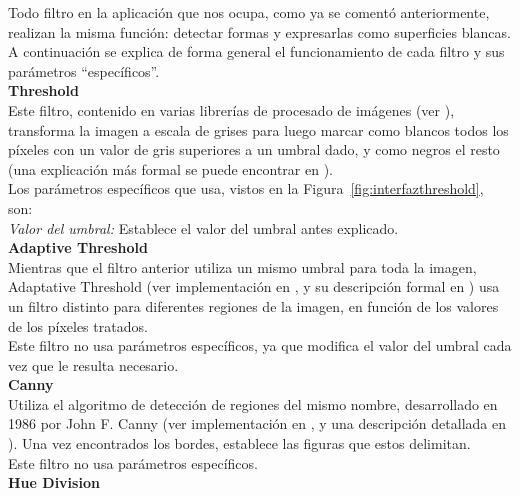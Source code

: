 		Todo filtro en la aplicación que nos ocupa, como ya se comentó anteriormente, realizan la misma función: detectar formas y expresarlas como superficies blancas. A continuación se explica de forma general el funcionamiento de cada filtro y sus parámetros ``específicos''.\\
		
	\noindent\textbf{Threshold}\\
		
		Este filtro, contenido en varias librerías de procesado de imágenes (ver \cite{opencvDoc}), transforma la imagen a escala de grises para luego marcar como blancos todos los píxeles con un valor de gris superiores a un umbral dado, y como negros el resto (una explicación más formal se puede encontrar en \cite{pajares}).\\
		
		Los parámetros específicos que usa, vistos en la Figura~\ref{fig:interfazthreshold}, son:\\		
		
		\noindent\textit{Valor del umbral:} Establece el valor del umbral antes explicado.\\
		
	\noindent\textbf{Adaptive Threshold}\\

		Mientras que el filtro anterior utiliza un mismo umbral para toda la imagen, Adaptative Threshold (ver implementación en \cite{opencvDoc},\color{blue} y su descripción formal en \cite{pajares}) usa un filtro distinto para diferentes regiones de la imagen, en función de los valores de los píxeles tratados.\color{black}\\ 
		
		Este filtro no usa parámetros específicos, ya que modifica el valor del umbral cada vez que le resulta necesario.\\
		
	\noindent\textbf{Canny}\\

		Utiliza el algoritmo de detección de regiones del mismo nombre, desarrollado en 1986 por John F. Canny (ver implementación en \cite{opencvDoc}, y una descripción detallada en \cite{pajares}). Una vez encontrados los bordes, establece las figuras que estos delimitan.\\
		
		Este filtro no usa parámetros específicos.\\
		
	\noindent\textbf{Hue Division}\\


